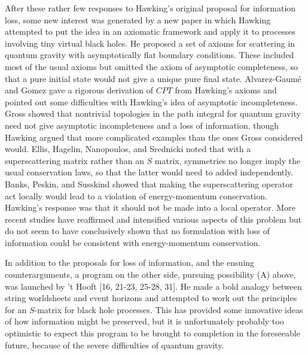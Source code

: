      After these rather few responses to Hawking's original proposal
for
information loss, some new interest was generated by a new paper
\cite{Haw82}
in which Hawking attempted to put the idea in an axiomatic framework
and apply
it to processes involving tiny virtual black holes.  He proposed a
set of
axioms for scattering in quantum gravity with asymptotically flat
boundary
conditions.  These included most of the usual axioms but omitted the
axiom of
asymptotic completeness, so that a pure initial state would not give
a unique
pure final state.  Alvarez-Gaum\'{e} and Gomez \cite{Alv83} gave a
rigorous
derivation of $CPT$ from Hawking's axioms and pointed out some
difficulties
with Hawking's idea of asymptotic incompleteness.  Gross \cite{Gro84}
showed
that nontrivial topologies in the path integral for quantum gravity
need not
give asymptotic incompleteness and a loss of information, though
Hawking
\cite{Haw84} argued that more complicated examples than the ones
Gross
considered would.  Ellis, Hagelin, Nanopoulos, and Srednicki
\cite{Ell84}
noted
that with a superscattering matrix rather than an $S$ matrix,
symmetries no
longer imply the usual conservation laws, so that the latter would
need to
added independently.  Banks, Peskin, and Susskind \cite{BPS} showed
that
making
the superscattering operator act locally would lead to a violation of
energy-momentum conservation.  Hawking's response \cite{Haw84} was
that it
should not be made into a local operator.  More recent studies
\cite{Sre,Liu}
have reaffirmed  and intensified various aspects of this problem but
do not
seem to have conclusively shown that no formulation with loss of
information
could be consistent with energy-momentum conservation.

     In addition to the proposals for loss of information, and the
ensuing
counterarguments, a program on the other side,
pursuing possibility (A) above, was launched by  't Hooft
[16, 21-23, 25-28, 31].
He made a bold analogy between string
worldsheets and event horizons and attempted to work out the
principles for an
$S$-matrix for black hole processes.  This has provided some
innovative ideas
of how information might be preserved, but it is unfortunately
probably too
optimistic to expect this program to be brought to completion in the
foreseeable future, because of the severe difficulties of quantum
gravity.

